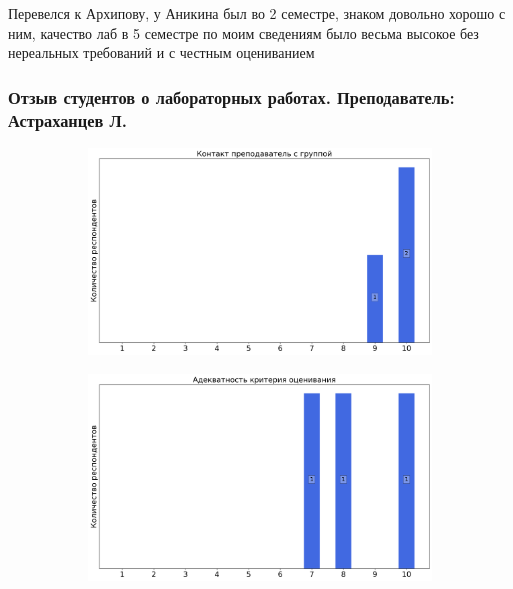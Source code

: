                 \begin{commentbox} 
                    Перевелся к Архипову, у Аникина был во 2 семестре, знаком довольно хорошо с ним, качество лаб в 5 семестре по моим сведениям было весьма высокое без нереальных требований и с честным оцениванием 
                \end{commentbox}


                
        \subsubsection{Отзыв студентов о лабораторных работах. Преподаватель: Астраханцев Л.}
            \begin{figure}[H]
                \centering
                \begin{subfigure}[b]{0.45\textwidth}
                    \centering
                    \includegraphics[width=\textwidth]{images/3 course/Общая физика - квантовая физика/labniks-marks-Астраханцев Л.-0.png}
                \end{subfigure}
                \begin{subfigure}[b]{0.45\textwidth}
                    \centering
                    \includegraphics[width=\textwidth]{images/3 course/Общая физика - квантовая физика/labniks-marks-Астраханцев Л.-1.png}

\end{subfigure}
\end{figure}
